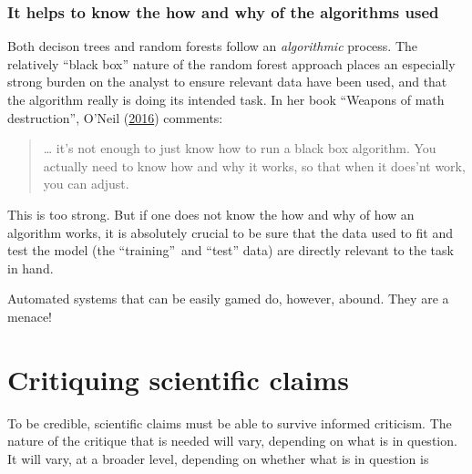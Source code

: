 \documentclass[
  10pt,
  b5paper]{book}
\begin{document}
\hypertarget{it-helps-to-know-the-how-and-why-of-the-algorithms-used}{%
\subsection*{It helps to know the how and why of the algorithms used}\label{it-helps-to-know-the-how-and-why-of-the-algorithms-used}}

Both decison trees and random forests follow an \emph{algorithmic}
process. The relatively ``black box'' nature of the random
forest approach places an especially strong burden on the
analyst to ensure relevant data have been used, and that the
algorithm really is doing its intended task.
In her book ``Weapons of math destruction'', O'Neil (\protect\hyperlink{ref-oneil_2016}{2016})
comments:

\begin{quote}
\ldots{} it's not enough to just know how to run a black box
algorithm. You actually need to know how and why it works,
so that when it does'nt work, you can adjust.
\end{quote}

This is too strong. But if one does not know the how and
why of how an algorithm works, it is absolutely crucial to
be sure that the data used to fit and test the model
(the ``training''~and ``test'' data) are directly relevant to
the task in hand.

Automated systems that can be easily gamed do, however,
abound. They are a menace!

\hypertarget{critiquing-scientific-claims}{%
\chapter{Critiquing scientific claims}\label{critiquing-scientific-claims}}

To be credible, scientific claims must be able to survive
informed criticism. The nature of the critique that is
needed will vary, depending on what is in question.
It will vary, at a broader level, depending on whether
what is in question is
\end{document}
